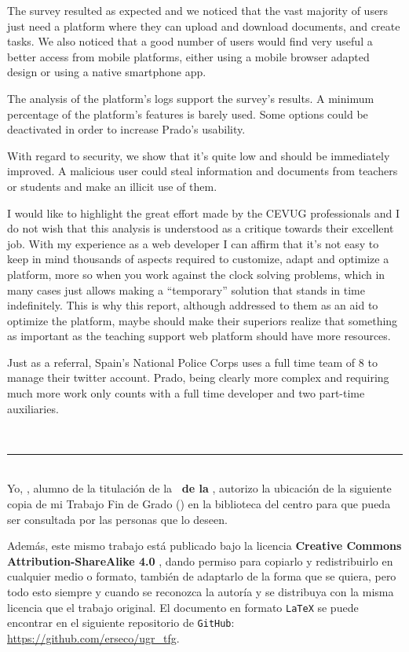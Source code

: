 {{\bigskip
The survey resulted as expected and we noticed that the vast majority of users just need a platform where they can upload and download documents, and create tasks. We also noticed that a good number of users would find very useful a better access from mobile platforms, either using a mobile browser adapted design or using a native smartphone app.

\bigskip
The analysis of the platform's logs support the survey’s results. A minimum percentage of the platform’s features is barely used. Some options could be deactivated in order to increase Prado’s usability.

\bigskip
With regard to security, we show that it's quite low and should be immediately improved. A malicious user could steal information and documents from teachers or students and make an illicit use of them.

\bigskip
I would like to highlight the great effort made by the CEVUG professionals and I do not wish that this analysis is understood as a critique towards their excellent job. With my experience as a web developer I can affirm that it’s not easy to keep in mind thousands of aspects required to customize, adapt and optimize a platform, more so when you work against the clock solving problems, which in many cases just allows making a ``temporary'' solution that stands in time indefinitely. This is why this report, although addressed to them as an aid to optimize the platform, maybe should make their superiors realize that something as important as the teaching support web platform should have more resources.

\bigskip
Just as a referral, Spain’s National Police Corps uses a full time team of 8 to manage their twitter account. Prado, being clearly more complex and requiring much more work only counts with a full time developer and two part-time auxiliaries. 


\newpage
\thispagestyle{empty}
\
\vspace{3cm}

\noindent\rule[-1ex]{\textwidth}{2pt}\\[4.5ex]

Yo, \textbf{\autor}, alumno de la titulación \textbf{\grado} de la \textbf{\escuela\ de la \universidad}, autorizo la ubicación de la siguiente copia de mi Trabajo Fin de Grado (\textit{\titulo}) en la biblioteca del centro para que pueda ser consultada por las personas que lo deseen.

\bigskip
Además, este mismo trabajo está publicado bajo la licencia \textbf{Creative Commons Attribution-ShareAlike 4.0} \cite{CC}, dando permiso para copiarlo y redistribuirlo en cualquier medio o formato, también de adaptarlo de la forma que se quiera, pero todo esto siempre y cuando se reconozca la autoría y se distribuya con la misma licencia que el trabajo original. El documento en formato {\tt LaTeX} se puede encontrar en el siguiente repositorio de {\tt GitHub}: \url{https://github.com/erseco/ugr_tfg}.

}}
